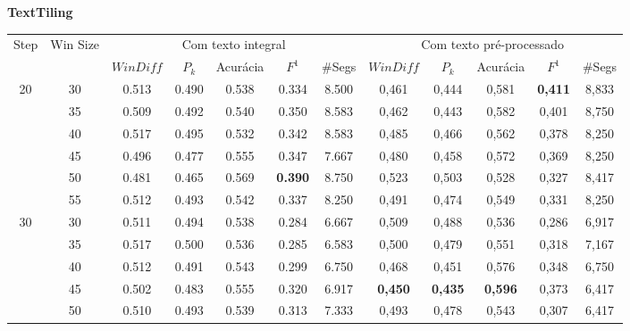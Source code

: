 



\begin{table}[!h]
\tiny \center
\textbf{TextTiling} \\ 
	\begin{tabular}{|c|c||c|c|c|c|c||c|c|c|c|c|}
\hline 
\multirow{2}{*}{Step} & \multirow{2}{*}{Win Size}
  & \multicolumn{5}{c||}{Com texto integral} & \multicolumn{5}{c|}{Com texto pré-processado}\\\cline{3-12} 
&& $WinDiff$ & $P_k$ & Acurácia & $F^1$ & \#Segs &  $WinDiff$ & $P_k$ & Acurácia & $F^1$ & \#Segs\\ \hline 
 \multirow{6}{*}{20} 
  & 30 & 0.513 & 0.490 & 0.538 & 0.334  & 8.500                 & 0,461 & 0,444 & 0,581 & \cellcolor{gray!20} \textbf{0,411} & 8,833  \\ \cline{2-12} 
  & 35 & 0.509 & 0.492 & 0.540 & 0.350  & 8.583                 & 0,462 & 0,443 & 0,582 & 0,401 & 8,750  \\  \cline{2-12}
  & 40 & 0.517 & 0.495 & 0.532 & 0.342  & 8.583                 & 0,485 & 0,466 & 0,562 & 0,378 & 8,250  \\  \cline{2-12}
  & 45 & 0.496 & 0.477 & 0.555 & 0.347  & 7.667                 & 0,480 & 0,458 & 0,572 & 0,369 & 8,250  \\  \cline{2-12}
  & 50 & 0.481 & 0.465 & 0.569 & \cellcolor{gray!20} \textbf{0.390} & 8.750  & 0,523 & 0,503 & 0,528 & 0,327 & 8,417  \\  \cline{2-12}
  & 55 & 0.512 & 0.493 & 0.542 & 0.337  & 8.250  & 0,491 & 0,474 & 0,549 & 0,331 & 8,250  \\ \hline      
 \multirow{6}{*}{30} 
  & 30 & 0.511 & 0.494 & 0.538 & 0.284  & 6.667                & 0,509 & 0,488 & 0,536 & 0,286 & 6,917  \\ \cline{2-12}    
  & 35 & 0.517 & 0.500 & 0.536 & 0.285  & 6.583                & 0,500 & 0,479 & 0,551 & 0,318 & 7,167  \\ \cline{2-12}         
  & 40 & 0.512 & 0.491 & 0.543 & 0.299  & 6.750                & 0,468 & 0,451 & 0,576 & 0,348 & 6,750  \\ \cline{2-12} 
  & 45 & 0.502 & 0.483 & 0.555 & 0.320  & 6.917                & \cellcolor{gray!20} \textbf{0,450} & \cellcolor{gray!20} \textbf{0,435} & \cellcolor{gray!20} \textbf{0,596} & 0,373 & 6,417  \\  \cline{2-12} 
  & 50 & 0.510 & 0.493 & 0.539 & 0.313  & 7.333                & 0,493 & 0,478 & 0,543 & 0,307 & 6,417  \\ \cline{2-12}                

\end{tabular}
\end{table}
